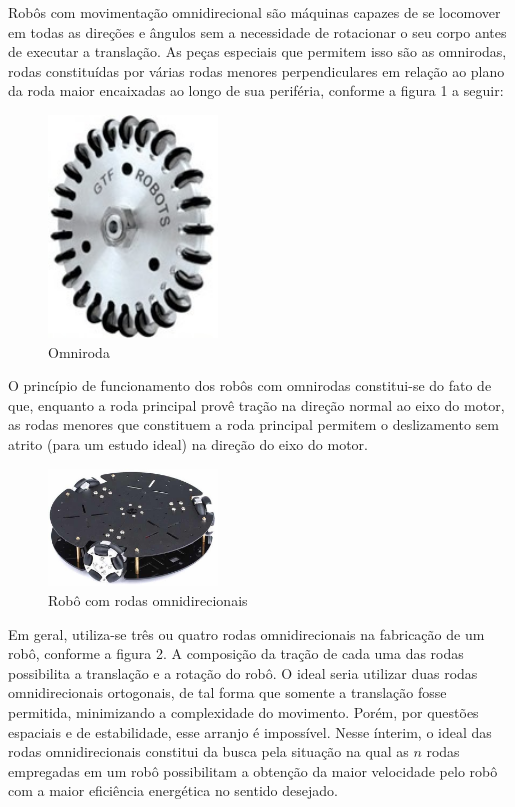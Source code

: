 \documentclass{article}
\begin{document}
\hspace{1cm}Robôs com movimentação omnidirecional são máquinas capazes de se locomover em todas as direções e ângulos sem a necessidade de rotacionar o seu corpo antes de executar a translação. As peças especiais que permitem isso são as omnirodas, rodas constituídas por várias rodas menores perpendiculares em relação ao plano da roda maior encaixadas ao longo de sua periféria, conforme a figura 1 a seguir:

\begin{figure}[H]
\centering
\includegraphics[width=0.4\textwidth]{omniroda.jpeg}
\caption{Omniroda}
\label{Rotulo}
\end{figure}

O princípio de funcionamento dos robôs com omnirodas constitui-se do fato de que, enquanto a roda principal provê tração na direção normal ao eixo do motor, as rodas menores que constituem a roda principal permitem o deslizamento sem atrito (para um estudo ideal) na direção do eixo do motor.

\begin{figure}[H]
\centering
\includegraphics[width=0.4\textwidth]{robo.jpeg}
\caption{Robô com rodas omnidirecionais}
\label{Rotulo}
\end{figure}


Em geral, utiliza-se três ou quatro rodas omnidirecionais na fabricação de um robô, conforme a figura 2. A composição da tração de cada uma das rodas possibilita a translação e a rotação do robô. O ideal seria utilizar duas rodas omnidirecionais ortogonais, de tal forma que somente a translação fosse permitida, minimizando a complexidade do movimento. Porém, por questões espaciais e de estabilidade, esse arranjo é impossível. 
Nesse ínterim, o ideal das rodas omnidirecionais constitui da busca pela situação na qual as $n$ rodas empregadas em um robô possibilitam a obtenção da maior velocidade pelo robô com a maior eficiência energética no sentido desejado.
\end{document}
